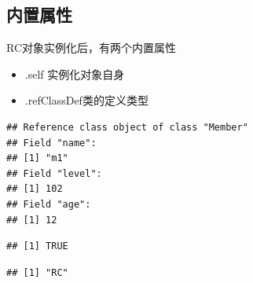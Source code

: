 \documentclass[]{book}
\newenvironment{Shaded}{\begin{snugshade}}{\end{snugshade}}
\newcommand{\KeywordTok}[1]{\textcolor[rgb]{0.13,0.29,0.53}{\textbf{#1}}}
\newcommand{\CommentTok}[1]{\textcolor[rgb]{0.56,0.35,0.01}{\textit{#1}}}
\newcommand{\OperatorTok}[1]{\textcolor[rgb]{0.81,0.36,0.00}{\textbf{#1}}}
\newcommand{\NormalTok}[1]{#1}
\begin{document}
\subsection{内置属性}

RC对象实例化后，有两个内置属性

\begin{itemize}
\item
  .self 实例化对象自身
\item
  .refClassDef类的定义类型
\end{itemize}

\begin{Shaded}
\end{Shaded}

\begin{verbatim}
## Reference class object of class "Member"
## Field "name":
## [1] "m1"
## Field "level":
## [1] 102
## Field "age":
## [1] 12
\end{verbatim}

\begin{Shaded}
\end{Shaded}

\begin{verbatim}
## [1] TRUE
\end{verbatim}

\begin{Shaded}
\end{Shaded}

\begin{verbatim}
## [1] "RC"
\end{verbatim}

\begin{Shaded}
\end{Shaded}
\end{document}
